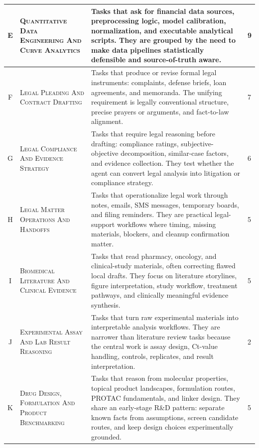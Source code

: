 {\begin{longtable}{cp{}p{}p{}}
E &
\textsc{Quantitative Data Engineering And Curve Analytics} &
Tasks that ask for financial data sources, preprocessing logic, model calibration, normalization, and executable analytical scripts. They are grouped by the need to make data pipelines statistically defensible and source-of-truth aware. &
9 \\
\midrule[0.75pt]

F &
\textsc{Legal Pleading And Contract Drafting} &
Tasks that produce or revise formal legal instruments: complaints, defense briefs, loan agreements, and memoranda. The unifying requirement is legally conventional structure, precise prayers or arguments, and fact-to-law alignment. &
7 \\
\midrule[0.75pt]

G &
\textsc{Legal Compliance And Evidence Strategy} &
Tasks that require legal reasoning before drafting: compliance ratings, subjective-objective decomposition, similar-case factors, and evidence collection. They test whether the agent can convert legal analysis into litigation or compliance strategy. &
6 \\
\midrule[0.75pt]

H &
\textsc{Legal Matter Operations And Handoffs} &
Tasks that operationalize legal work through notes, emails, SMS messages, temporary boards, and filing reminders. They are practical legal-support workflows where timing, missing materials, blockers, and cleanup confirmation matter. &
5 \\
\midrule[0.75pt]

I &
\textsc{Biomedical Literature And Clinical Evidence} &
Tasks that read pharmacy, oncology, and clinical-study materials, often correcting flawed local drafts. They focus on literature storylines, figure interpretation, study workflow, treatment pathways, and clinically meaningful evidence synthesis. &
5 \\
\midrule[0.75pt]

J &
\textsc{Experimental Assay And Lab Result Reasoning} &
Tasks that turn raw experimental materials into interpretable analysis workflows. They are narrower than literature review tasks because the central work is assay design, Ct-value handling, controls, replicates, and result interpretation. &
2 \\
\midrule[0.75pt]

K &
\textsc{Drug Design, Formulation And Product Benchmarking} &
Tasks that reason from molecular properties, topical product landscapes, formulation routes, PROTAC fundamentals, and linker design. They share an early-stage R\&D pattern: separate known facts from assumptions, screen candidate routes, and keep design choices experimentally grounded. &
5 \\
\midrule[0.75pt]


\end{longtable}}
